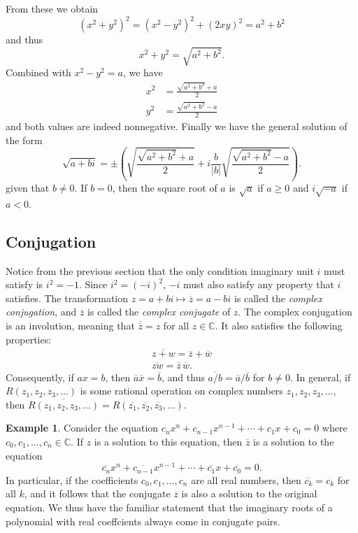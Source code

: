 \documentclass[11pt,oneside,reqno]{amsart}
\newcommand\C{{\mathbb C}}
\numberwithin{equation}{section}
\theoremstyle{definition}
\newtheorem{example}[theorem]{Example}
\theoremstyle{remark}
\begin{document}
From these we obtain 
\[(x^2 + y^2)^2 = (x^2 - y^2)^2 + (2xy)^2 = a^2 + b^2\]
and thus 
\[x^2 + y^2 = \sqrt{a^2 + b^2}.\]
Combined with $x^2 - y^2 = a$, we have
\begin{align*}
    x^2 &= \frac{\sqrt{a^2 + b^2} + a}{2} \\
    y^2 &= \frac{\sqrt{a^2 + b^2} - a}{2}
\end{align*}
and both values are indeed nonnegative. Finally we have the general solution of the form
\[\sqrt{a + bi} = \pm \left( \sqrt{\frac{\sqrt{a^2 + b^2} + a}{2}} + i\frac{b}{|b|}\sqrt{\frac{\sqrt{a^2 + b^2} - a}{2}} \right).\]
given that $b \neq 0$. If $b = 0$, then the square root of $a$ is $\sqrt{a}$ if $a \geq 0$ and $i\sqrt{-a}$ if $a < 0$.


\subsection{Conjugation} Notice from the previous section that the only condition imaginary unit $i$ must satisfy is $i^2 = -1$. Since $i^2 = (-i)^2$, 
$-i$ must also satisfy any property that $i$ satisfies. The transformation $z = a + bi \mapsto \overline{z} = a - bi$ is called the \textit{complex conjugation}, and $\overline{z}$ is called the \textit{complex conjugate} of $z$.
The complex conjugation is an involution, meaning that $\overline{\overline{z}} = z$ for all $z \in \C$. It also satisfies the following properties:
\begin{gather*}
    \overline{z + w} = \overline{z} + \overline{w} \\
    \overline{zw} = \overline{z}\,\overline{w}.
\end{gather*} 
Consequently, if $ax = b$, then $\overline{a}\overline{x} = \overline{b}$, and thus $\overline{a/b} = \overline{a}/\overline{b}$ for $b \neq 0$. In general, 
if $R(z_1, z_2, z_3, \dots)$ is some rational operation on complex numbers $z_1, z_2, z_3, \dots$, then $\overline{R(z_1, z_2, z_3, \dots)} = R(\overline{z_1}, \overline{z_2}, \overline{z_3}, \dots)$. 
\begin{example}
    Consider the equation $c_nx^n + c_{n-1}x^{n-1} + \cdots + c_1x + c_0 = 0$ where $c_0, c_1, \dots, c_n \in \C$. If $z$ is a solution to this equation, then $\overline{z}$ is a solution to the equation
    \[\overline{c_n}x^n + \overline{c_{n-1}}x^{n-1} + \cdots + \overline{c_1}x + \overline{c_0} = 0.\] 
    In particular, if the coefficients $c_0, c_1, \dots, c_n$ are all real numbers, then $\overline{c_k} = c_k$ for all $k$, and it follows that the conjugate $\overline{z}$ is also a solution to the original equation.
    We thus have the familiar statement that the imaginary roots of a polynomial with real coeffcients always come in conjugate pairs. 
\end{example}
\end{document}
